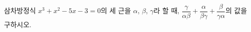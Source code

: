 삼차방정식 $x^3+x^2-5x-3=0$의 세 근을 $\alpha$, $\beta$, $\gamma$라 할 때, $\dfrac{\gamma}{\alpha\beta}+\dfrac{\alpha}{\beta\gamma}+\dfrac{\beta}{\gamma\alpha}$의 값을 구하시오.
